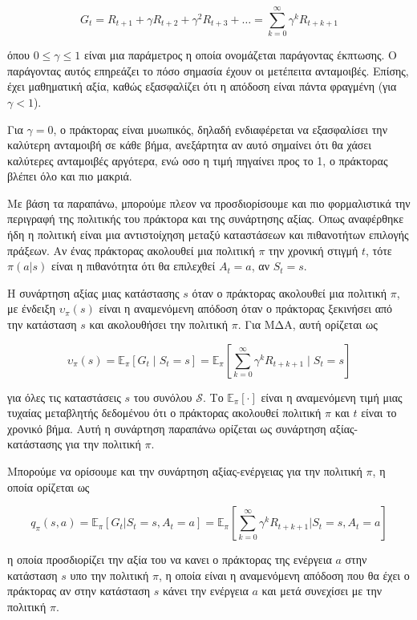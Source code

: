 \begin{equation}
    G_t = R_{t+1} + γ R_{t+2} + γ^2 R_{t+3} + \ldots = \sum_{k=0}^{\infty}γ^k R_{t+k+1}
\end{equation}

όπου $ 0 \leq γ \leq 1$ είναι μια παράμετρος η οποία ονομάζεται παράγοντας έκπτωσης.
Ο παράγοντας αυτός επηρεάζει το πόσο σημασία έχουν οι μετέπειτα ανταμοιβές.
Επίσης, έχει μαθηματική αξία, καθώς εξασφαλίζει ότι η απόδοση είναι πάντα φραγμένη (για $γ < 1$).

Για $γ = 0$, ο πράκτορας είναι μυωπικός, δηλαδή ενδιαφέρεται να εξασφαλίσει την καλύτερη ανταμοιβή σε κάθε βήμα,
ανεξάρτητα αν αυτό σημαίνει ότι θα χάσει καλύτερες ανταμοιβές αργότερα, ενώ οσο η τιμή πηγαίνει προς το 1,
ο πράκτορας βλέπει όλο και πιο μακριά.

Με βάση τα παραπάνω, μπορούμε πλεον να προσδιορίσουμε και πιο φορμαλιστικά την περιγραφή της πολιτικής του πράκτορα και της συνάρτησης αξίας.
Οπως αναφέρθηκε ήδη η πολιτική είναι μια αντιστοίχηση μεταξύ καταστάσεων και πιθανοτήτων επιλογής πράξεων.
Αν ένας πράκτορας ακολουθεί μια πολιτική $π$ την χρονική στιγμή $t$, τότε $π(a|s)$ είναι η πιθανότητα ότι θα επιλεχθεί $A_t = a$, αν $S_t =s$.

Η συνάρτηση αξίας μιας κατάστασης $s$ όταν ο πράκτορας ακολουθεί μια πολιτική $π$,
με ένδειξη $υ_π(s)$ είναι η αναμενόμενη απόδοση όταν ο πράκτορας ξεκινήσει από την κατάσταση $s$
και ακολουθήσει την πολιτική $π$. Για ΜΔΑ, αυτή ορίζεται ως

\begin{equation}
    υ_π(s) = \mathbb{E}_π[G_t\;|\;S_t = s] = \mathbb{E}_π \left[ \sum_{k=0}^{\infty}γ^kR_{t+k+1}\;\bigg|\;S_t = s\right]
\end{equation}

για όλες τις καταστάσεις $s$ του συνόλου $\mathcal{S}$.
Το $\mathbb{E}_π[\cdot]$ είναι η αναμενόμενη τιμή μιας τυχαίας μεταβλητής δεδομένου ότι ο πράκτορας ακολουθεί πολιτική
$π$ και $t$ είναι το χρονικό βήμα. Αυτή η συνάρτηση παραπάνω ορίζεται ως συνάρτηση αξίας-κατάστασης για την πολιτική $π$.

Μπορούμε να ορίσουμε και την συνάρτηση αξίας-ενέργειας για την πολιτική $π$, η οποία ορίζεται ως

\begin{equation}
    q_π(s,a) = \mathbb{E}_π[G_t | S_t = s, A_t = a] = \mathbb{E}_π\left[ \sum_{k=0}^{\infty} γ^k R_{t+k+1} \bigg| S_t = s, A_t = a\right]
\end{equation}

η οποία προσδιορίζει την αξία του να κανει ο πράκτορας της ενέργεια $a$ στην κατάσταση $s$ υπο την πολιτική $π$,
η οποία είναι η αναμενόμενη απόδοση που θα έχει ο πράκτορας αν στην κατάσταση $s$ κάνει την ενέργεια $a$ και μετά συνεχίσει με την πολιτική $π$.

